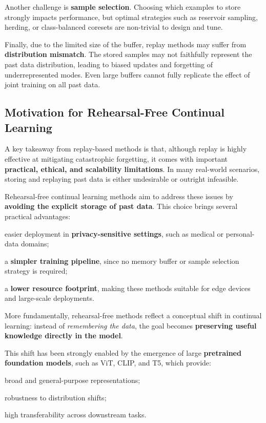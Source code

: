 Another challenge is \textbf{sample selection}. Choosing which examples to store strongly
impacts performance, but optimal strategies such as reservoir sampling, herding, or
class-balanced coresets are non-trivial to design and tune.

Finally, due to the limited size of the buffer, replay methods may suffer from
\textbf{distribution mismatch}. The stored samples may not faithfully represent the past
data distribution, leading to biased updates and forgetting of underrepresented modes.
Even large buffers cannot fully replicate the effect of joint training on all past data.

\subsection{Motivation for Rehearsal-Free Continual Learning}

A key takeaway from replay-based methods is that, although replay is highly effective at
mitigating catastrophic forgetting, it comes with important \textbf{practical, ethical,
and scalability limitations}. In many real-world scenarios, storing and replaying past data
is either undesirable or outright infeasible.

Rehearsal-free continual learning methods aim to address these issues by \textbf{avoiding
the explicit storage of past data}. This choice brings several practical advantages:
\begin{compactitemize}
    \item easier deployment in \textbf{privacy-sensitive settings}, such as medical or
    personal-data domains;
    \item a \textbf{simpler training pipeline}, since no memory buffer or sample selection
    strategy is required;
    \item a \textbf{lower resource footprint}, making these methods suitable for edge
    devices and large-scale deployments.
\end{compactitemize}

More fundamentally, rehearsal-free methods reflect a conceptual shift in continual
learning: instead of \emph{remembering the data}, the goal becomes \textbf{preserving
useful knowledge directly in the model}.

This shift has been strongly enabled by the emergence of large \textbf{pretrained
foundation models}, such as ViT, CLIP, and T5, which provide:
\begin{compactitemize}
    \item broad and general-purpose representations;
    \item robustness to distribution shifts;
    \item high transferability across downstream tasks.
\end{compactitemize}

